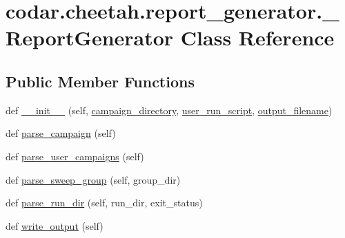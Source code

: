 \hypertarget{classcodar_1_1cheetah_1_1report__generator_1_1___report_generator}{}\section{codar.\+cheetah.\+report\+\_\+generator.\+\_\+\+Report\+Generator Class Reference}
\label{classcodar_1_1cheetah_1_1report__generator_1_1___report_generator}
\subsection*{Public Member Functions}
\begin{DoxyCompactItemize}
\item 
def \hyperlink{classcodar_1_1cheetah_1_1report__generator_1_1___report_generator_aaadff1978efa6b29137c24a5ae751a0a}{\+\_\+\+\_\+init\+\_\+\+\_\+} (self, \hyperlink{classcodar_1_1cheetah_1_1report__generator_1_1___report_generator_af615220380d67caed4686343b50f5f0b}{campaign\+\_\+directory}, \hyperlink{classcodar_1_1cheetah_1_1report__generator_1_1___report_generator_a868bf9c8f33e399015e09703424aa7d3}{user\+\_\+run\+\_\+script}, \hyperlink{classcodar_1_1cheetah_1_1report__generator_1_1___report_generator_aa91a80020bdeb52076dfa246ca9d84be}{output\+\_\+filename})
\item 
def \hyperlink{classcodar_1_1cheetah_1_1report__generator_1_1___report_generator_af247fa30d32308bfa7119cebcf9e7742}{parse\+\_\+campaign} (self)
\item 
def \hyperlink{classcodar_1_1cheetah_1_1report__generator_1_1___report_generator_a252765e13f6227fa2b5bc439a3058017}{parse\+\_\+user\+\_\+campaigns} (self)
\item 
def \hyperlink{classcodar_1_1cheetah_1_1report__generator_1_1___report_generator_a3d382ee82b5ddfe83eb7c4ee5a82b40d}{parse\+\_\+sweep\+\_\+group} (self, group\+\_\+dir)
\item 
def \hyperlink{classcodar_1_1cheetah_1_1report__generator_1_1___report_generator_a73a4ffecbd6ea0a4f47fef44f094193b}{parse\+\_\+run\+\_\+dir} (self, run\+\_\+dir, exit\+\_\+status)
\item 
def \hyperlink{classcodar_1_1cheetah_1_1report__generator_1_1___report_generator_afa3df970816cabee4c9f898dd73db8ee}{write\+\_\+output} (self)
\end{DoxyCompactItemize}
